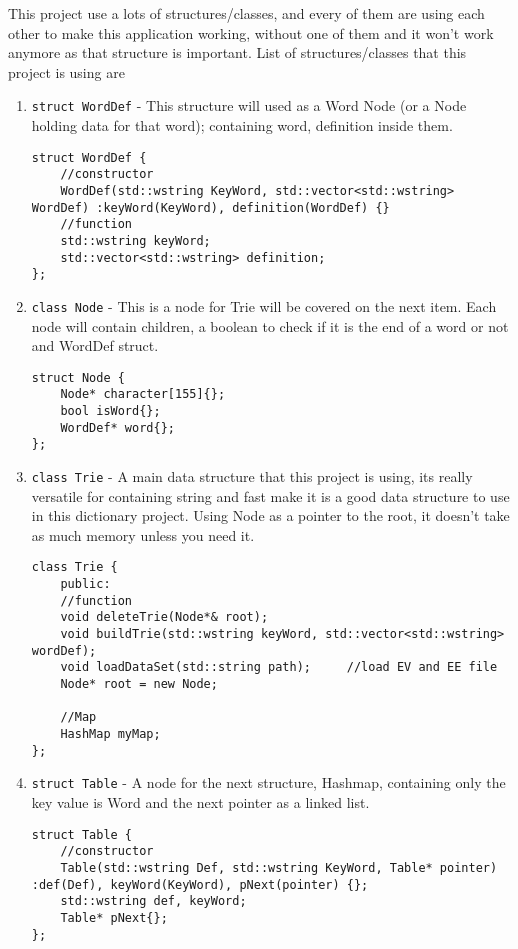 \documentclass[sn-mathphys,Numbered]{sn-jnl}%
\begin{document}
This project use a lots of structures/classes, and every of them are using each other to make this application working, without one of them and it won't work anymore as that structure is important. List of structures/classes that this project is using are

\begin{enumerate}
	\item \lstinline|struct WordDef| - This structure will used as a Word Node (or a Node holding data for that word); containing word, definition inside them.
	\begin{lstlisting}
struct WordDef {
	//constructor
	WordDef(std::wstring KeyWord, std::vector<std::wstring> WordDef) :keyWord(KeyWord), definition(WordDef) {}
	//function
	std::wstring keyWord;
	std::vector<std::wstring> definition;
};
	\end{lstlisting}
	
	\item \lstinline|class Node| - This is a node for Trie will be covered on the next item. Each node will contain children, a boolean to check if it is the end of a word or not and WordDef struct.
	\begin{lstlisting}
struct Node {
	Node* character[155]{};
	bool isWord{};
	WordDef* word{};
};
	\end{lstlisting}
	
	\item \lstinline|class Trie| - A main data structure that this project is using, its really versatile for containing string and fast make it is a good data structure to use in this dictionary project. Using Node as a pointer to the root, it doesn't take as much memory unless you need it.
	\begin{lstlisting}
class Trie {
	public:
	//function
	void deleteTrie(Node*& root);
	void buildTrie(std::wstring keyWord, std::vector<std::wstring> wordDef);
	void loadDataSet(std::string path);		//load EV and EE file
	Node* root = new Node;
	
	//Map
	HashMap myMap;
};
	\end{lstlisting}
	
	\item \lstinline|struct Table| - A node for the next structure, Hashmap, containing only the key value is Word and the next pointer as a linked list.
	\begin{lstlisting}
struct Table {
	//constructor
	Table(std::wstring Def, std::wstring KeyWord, Table* pointer) :def(Def), keyWord(KeyWord), pNext(pointer) {};
	std::wstring def, keyWord;
	Table* pNext{};
};	
	\end{lstlisting}
	

\end{enumerate}
\end{document}
